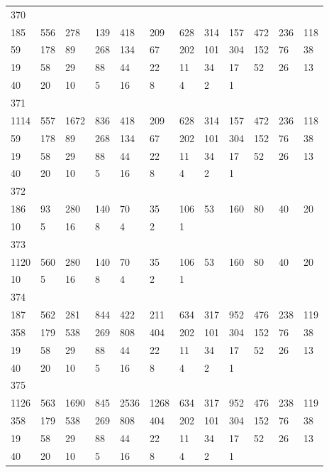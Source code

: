 \begin{longtable}{llllllllllll}
370&&&&&&&&&&&\\
185& 556& 278& 139& 418& 209& 628& 314& 157& 472& 236& 118\\
59& 178& 89& 268& 134& 67& 202& 101& 304& 152& 76& 38\\
19& 58& 29& 88& 44& 22& 11& 34& 17& 52& 26& 13\\
40& 20& 10& 5& 16& 8& 4& 2& 1& \\

371&&&&&&&&&&&\\
1114& 557& 1672& 836& 418& 209& 628& 314& 157& 472& 236& 118\\
59& 178& 89& 268& 134& 67& 202& 101& 304& 152& 76& 38\\
19& 58& 29& 88& 44& 22& 11& 34& 17& 52& 26& 13\\
40& 20& 10& 5& 16& 8& 4& 2& 1& \\

372&&&&&&&&&&&\\
186& 93& 280& 140& 70& 35& 106& 53& 160& 80& 40& 20\\
10& 5& 16& 8& 4& 2& 1& \\

373&&&&&&&&&&&\\
1120& 560& 280& 140& 70& 35& 106& 53& 160& 80& 40& 20\\
10& 5& 16& 8& 4& 2& 1& \\

374&&&&&&&&&&&\\
187& 562& 281& 844& 422& 211& 634& 317& 952& 476& 238& 119\\
358& 179& 538& 269& 808& 404& 202& 101& 304& 152& 76& 38\\
19& 58& 29& 88& 44& 22& 11& 34& 17& 52& 26& 13\\
40& 20& 10& 5& 16& 8& 4& 2& 1& \\

375&&&&&&&&&&&\\
1126& 563& 1690& 845& 2536& 1268& 634& 317& 952& 476& 238& 119\\
358& 179& 538& 269& 808& 404& 202& 101& 304& 152& 76& 38\\
19& 58& 29& 88& 44& 22& 11& 34& 17& 52& 26& 13\\
40& 20& 10& 5& 16& 8& 4& 2& 1& \\


\end{longtable}
